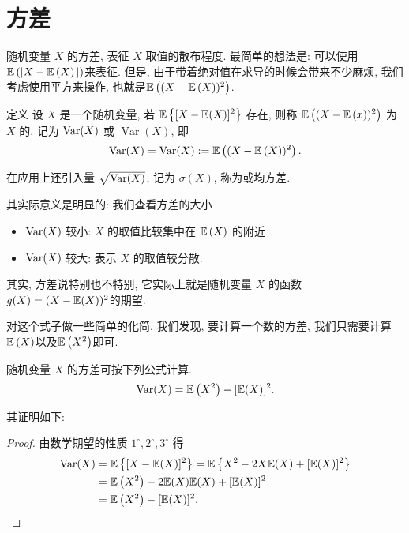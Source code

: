 \section{方差}
随机变量 $X$ 的方差, 表征 $X$ 取值的散布程度. 最简单的想法是: 可以使用$\mathbb E\left(|X-\mathbb E\left(X\right)|\right)$来表征. 但是, 由于带着绝对值在求导的时候会带来不少麻烦, 我们考虑使用平方来操作, 也就是$\mathbb E\left((X-\mathbb E\left(X\right))^2\right)$. 

\begin{definition}
    定义 设 $X$ 是一个随机变量, 若 $\mathbb E\left\{[X-\mathbb E(X)]^2\right\}$ 存在, 则称 $\mathbb E\left((X-\mathbb E\left(x\right))^2\right)$ 为 $X$ 的, 记为 $\operatorname{Var}(X)$ 或 $\operatorname{Var}(X)$, 即
$$
\operatorname{Var}(X)=\operatorname{Var}(X):=\mathbb E\left((X-\mathbb E\left(X\right))^2\right).
$$
\end{definition}

在应用上还引入量 $\sqrt{\operatorname{Var}(X)}$, 记为 $\sigma(X)$, 称为或均方差.

其实际意义是明显的: 我们查看方差的大小
\begin{itemize}
    \item $\operatorname{Var} (X)$ 较小:  $X$ 的取值比较集中在 $\mathbb E\left(X\right) $ 的附近
    \item $\operatorname{Var}(X)$ 较大: 表示 $X$ 的取值较分散.
\end{itemize}

其实, 方差说特别也不特别, 它实际上就是随机变量 $X$ 的函数 $g(X)=(X-\mathbb E(X))^2$的期望. 

对这个式子做一些简单的化简, 我们发现, 要计算一个数的方差, 我们只需要计算$\mathbb E\left(X\right)$以及$\mathbb E\left(X^2\right)$即可. 

   \begin{proposition}
       随机变量 $X$ 的方差可按下列公式计算.
   $$
   \operatorname{Var}(X)=\mathbb E\left(X^2\right)-[\mathbb E(X)]^2 .
   $$
   \end{proposition}
   
   其证明如下: 
   \begin{proof}
       由数学期望的性质 $1^{\circ}, 2^{\circ}, 3^{\circ}$ 得
   $$
   \begin{aligned}
   \operatorname{Var}(X) & =\mathbb E\left\{[X-\mathbb E(X)]^2\right\}=\mathbb E\left\{X^2-2 X \mathbb E(X)+[\mathbb E(X)]^2\right\} \\
   & =\mathbb E\left( X^2\right)-2 \mathbb E(X) \mathbb E(X)+[\mathbb E(X)]^2 \\
   & =\mathbb E\left(X^2\right)-[\mathbb E(X)]^2 .
   \end{aligned}
   $$
      \end{proof}




